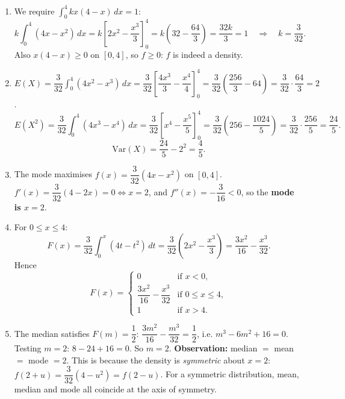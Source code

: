 \documentclass[11pt]{article}
\begin{document}
\begin{corrige}
\begin{enumerate}
\item We require $\displaystyle\int_0^4 kx(4-x)\,dx=1$:
\[
k\int_0^4 (4x-x^2)\,dx=k\left[2x^2-\frac{x^3}{3}\right]_0^4=k\left(32-\frac{64}{3}\right)=\frac{32k}{3}=1
\quad\Longrightarrow\quad k=\frac{3}{32}.
\]
Also $x(4-x)\geq 0$ on $[0,4]$, so $f\geq 0$: $f$ is indeed a density.

\item $E(X)=\dfrac{3}{32}\displaystyle\int_0^4 (4x^2-x^3)\,dx=\dfrac{3}{32}\left[\dfrac{4x^3}{3}-\dfrac{x^4}{4}\right]_0^4=\dfrac{3}{32}\left(\dfrac{256}{3}-64\right)=\dfrac{3}{32}\cdot\dfrac{64}{3}=2$.
\[
E(X^2)=\frac{3}{32}\int_0^4 (4x^3-x^4)\,dx=\frac{3}{32}\left[x^4-\frac{x^5}{5}\right]_0^4=\frac{3}{32}\left(256-\frac{1024}{5}\right)=\frac{3}{32}\cdot\frac{256}{5}=\frac{24}{5}.
\]
\[
\mathrm{Var}(X)=\frac{24}{5}-2^2=\frac{4}{5}.
\]

\item The mode maximises $f(x)=\dfrac{3}{32}(4x-x^2)$ on $[0,4]$. $f'(x)=\dfrac{3}{32}(4-2x)=0\iff x=2$, and $f''(x)=-\dfrac{3}{16}<0$, so the \textbf{mode is $x=2$}.

\item For $0\leq x\leq 4$:
\[
F(x)=\frac{3}{32}\int_0^x (4t-t^2)\,dt=\frac{3}{32}\left(2x^2-\frac{x^3}{3}\right)=\frac{3x^2}{16}-\frac{x^3}{32}.
\]
Hence
\[
F(x)=\begin{cases} 0 & \text{if } x<0,\\ \dfrac{3x^2}{16}-\dfrac{x^3}{32} & \text{if } 0\leq x\leq 4,\\ 1 & \text{if } x>4.\end{cases}
\]

\item The median satisfies $F(m)=\dfrac12$: $\dfrac{3m^2}{16}-\dfrac{m^3}{32}=\dfrac12$, i.e. $m^3-6m^2+16=0$. Testing $m=2$: $8-24+16=0$. So $m=2$. \textbf{Observation:} median $=$ mean $=$ mode $=2$. This is because the density is \emph{symmetric} about $x=2$: $f(2+u)=\dfrac{3}{32}(4-u^2)=f(2-u)$. For a symmetric distribution, mean, median and mode all coincide at the axis of symmetry.
\end{enumerate}
\end{corrige}
\end{document}
